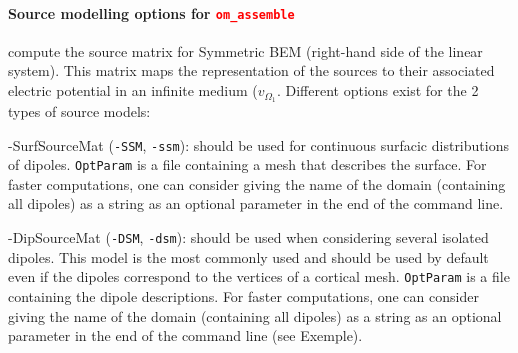 \documentclass[10pt,journal]{book}
\newcommand{\commandName}[1]{\textcolor{red}{\tt #1}}
\newcommand{\optionName}[1]{\textcolor{OliveGreen}{\tt #1}}
\newcommand*\OptionsLabel[1]{\optionName{#1}}
\newenvironment{Options}{
    \begin{list}{}{
        \let\makelabel\OptionsLabel\setlength\labelwidth{30pt}%
        \setlength\leftmargin{\labelwidth+\labelsep}}}
    {\end{list}}
\begin{document}
        \paragraph*{Source modelling options for \commandName{om\_assemble}} compute the source matrix for Symmetric BEM (right-hand side of the linear system).
            This matrix maps the representation of the sources to their associated electric potential in an infinite medium ($v_{\Omega_1}$.
            Different options exist for the 2 types of source models:
            \begin{Options}
                \item[-SurfSourceMat] (\optionName{-SSM}, \optionName{-ssm}): should be used for continuous surfacic distributions of dipoles.
                        \optionName{OptParam} is a file containing a mesh that describes the surface.  For faster computations, one can consider giving the name of the domain (containing all dipoles) as a string as an optional parameter in the end of the command line.
                \item[-DipSourceMat] (\optionName{-DSM}, \optionName{-dsm}): should be used when considering several isolated dipoles. This model is the most commonly
                        used and should be used by default even if the dipoles correspond to the vertices of a cortical mesh.
                        \optionName{OptParam} is a file containing the dipole descriptions.  For faster computations, one can consider giving the name of the domain (containing all dipoles) as a string as an optional parameter in the end of the command line (see Exemple).

            \end{Options}
\end{document}
